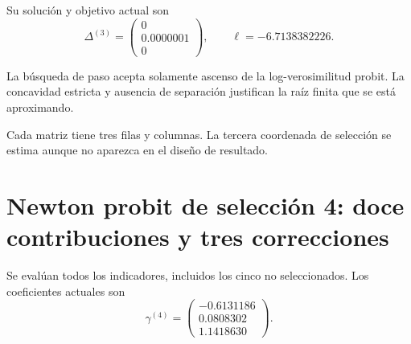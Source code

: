 \documentclass[11pt,a4paper]{article}
\begin{document}
Su solución y objetivo actual son
\[
\Delta^{(3)}=\begin{pmatrix}0\\0.0000001\\0\end{pmatrix},\qquad\ell=-6.7138382226.
\]

La búsqueda de paso
acepta solamente ascenso
de la log-verosimilitud probit.
La concavidad estricta y
ausencia de separación
justifican la raíz finita
que se está aproximando.

Cada matriz tiene tres
filas y columnas.
La tercera coordenada
de selección se estima
aunque no aparezca
en el diseño de resultado.

\clearpage
\section{Newton probit de selección 4: doce contribuciones y tres correcciones}\label{unidad159}
Se evalúan todos los indicadores,
incluidos los cinco no seleccionados.
Los coeficientes actuales son
\[
\gamma^{(4)}=\begin{pmatrix}-0.6131186\\0.0808302\\1.1418630\end{pmatrix}.
\]
\end{document}
